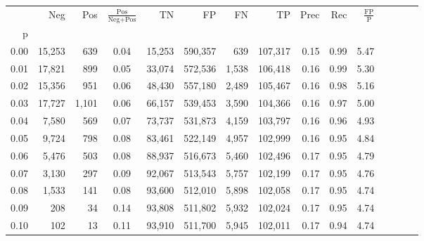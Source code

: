 \begin{tabular}{rrrcrrrrrrrrrrr}
\toprule
{} &     Neg &    Pos & $\frac{\text{Pos}}{\text{Neg}+\text{Pos}}$ &       TN &       FP &       FN &       TP &  Prec &   Rec & $\frac{\text{FP}}{\text{P}}$ \\
p    &         &        &                                            &          &          &          &          &       &       &                              \\
\midrule
0.00 &  15,253 &    639 &                                       0.04 &   15,253 &  590,357 &      639 &  107,317 &  0.15 &  0.99 &                         5.47 \\
0.01 &  17,821 &    899 &                                       0.05 &   33,074 &  572,536 &    1,538 &  106,418 &  0.16 &  0.99 &                         5.30 \\
0.02 &  15,356 &    951 &                                       0.06 &   48,430 &  557,180 &    2,489 &  105,467 &  0.16 &  0.98 &                         5.16 \\
0.03 &  17,727 &  1,101 &                                       0.06 &   66,157 &  539,453 &    3,590 &  104,366 &  0.16 &  0.97 &                         5.00 \\
0.04 &   7,580 &    569 &                                       0.07 &   73,737 &  531,873 &    4,159 &  103,797 &  0.16 &  0.96 &                         4.93 \\
0.05 &   9,724 &    798 &                                       0.08 &   83,461 &  522,149 &    4,957 &  102,999 &  0.16 &  0.95 &                         4.84 \\
0.06 &   5,476 &    503 &                                       0.08 &   88,937 &  516,673 &    5,460 &  102,496 &  0.17 &  0.95 &                         4.79 \\
0.07 &   3,130 &    297 &                                       0.09 &   92,067 &  513,543 &    5,757 &  102,199 &  0.17 &  0.95 &                         4.76 \\
0.08 &   1,533 &    141 &                                       0.08 &   93,600 &  512,010 &    5,898 &  102,058 &  0.17 &  0.95 &                         4.74 \\
0.09 &     208 &     34 &                                       0.14 &   93,808 &  511,802 &    5,932 &  102,024 &  0.17 &  0.95 &                         4.74 \\
0.10 &     102 &     13 &                                       0.11 &   93,910 &  511,700 &    5,945 &  102,011 &  0.17 &  0.94 &                         4.74 \\

\end{tabular}
